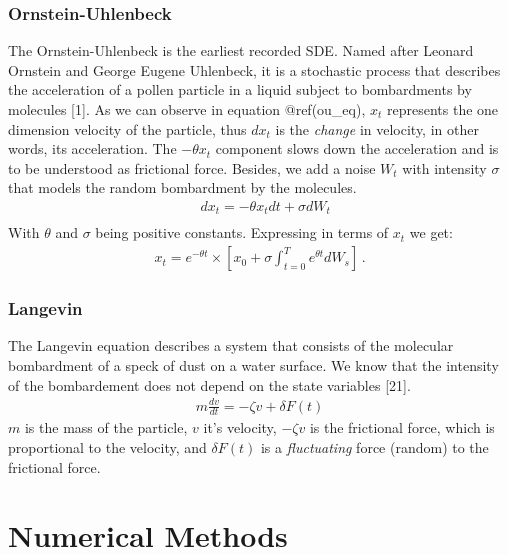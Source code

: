 \documentclass[12pt,twoside]{reedthesis}
\theoremstyle{definition}
\theoremstyle{definition}
\theoremstyle{remark}
\begin{document}
  \subsubsection{Ornstein-Uhlenbeck}\label{ornstein-uhlenbeck}
  
  The Ornstein-Uhlenbeck is the earliest recorded SDE. Named after Leonard
  Ornstein and George Eugene Uhlenbeck, it is a stochastic process that
  describes the acceleration of a pollen particle in a liquid subject to
  bombardments by molecules {[}1{]}. As we can observe in equation
  @ref(ou\_eq), \(x_t\) represents the one dimension velocity of the
  particle, thus \(dx_t\) is the \emph{change} in velocity, in other
  words, its acceleration. The \(- \theta x_t\) component slows down the
  acceleration and is to be understood as frictional force. Besides, we
  add a noise \(W_t\) with intensity \(\sigma\) that models the random
  bombardment by the molecules.
  \begin{align} \label{ou_eq}
  &d x_t = - \theta x_t dt + \sigma d W_t \\
  \end{align}
  With \(\theta\) and \(\sigma\) being positive constants. Expressing in
  terms of \(x_t\) we get:
  \begin{align}
  x_t = e^{-\theta t} \times \left[ x_0  + \sigma \int_{t=0}^{T} e^{\theta t} d W_s \right] \,.
  \end{align}
  \subsubsection{Langevin}\label{langevin}
  
  The Langevin equation describes a system that consists of the molecular
  bombardment of a speck of dust on a water surface. We know that the
  intensity of the bombardement does not depend on the state variables
  {[}21{]}.
  \begin{align}
  m \frac{dv}{dt} = -\zeta v + \delta F (t) 
  \end{align}
  \(m\) is the mass of the particle, \(v\) it's velocity, \(-\zeta v\) is
  the frictional force, which is proportional to the velocity, and
  \(\delta F (t)\) is a \emph{fluctuating} force (random) to the
  frictional force.
  
  \section{Numerical Methods}\label{numerical-methods}
  
\end{document}

